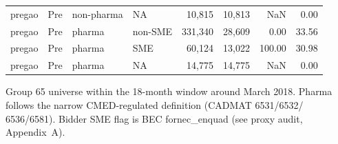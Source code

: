 \begin{table}[htbp]
\begin{threeparttable}
\begin{tabular}{llllrrrr}
pregao & Pre & non-pharma & NA & 10,815 & 10,813 & NaN & 0.00 \\
pregao & Pre & pharma & non-SME & 331,340 & 28,609 & 0.00 & 33.56 \\
pregao & Pre & pharma & SME & 60,124 & 13,022 & 100.00 & 30.98 \\
pregao & Pre & pharma & NA & 14,775 & 14,775 & NaN & 0.00 \\
\bottomrule
\end{tabular}
\begin{tablenotes}\footnotesize
\item Group 65 universe within the 18-month window around March 2018.
Pharma follows the narrow CMED-regulated definition (CADMAT 6531/6532/
6536/6581). Bidder SME flag is BEC fornec\_enquad (see proxy audit,
Appendix~A).
\end{tablenotes}
\end{threeparttable}
\end{table}
